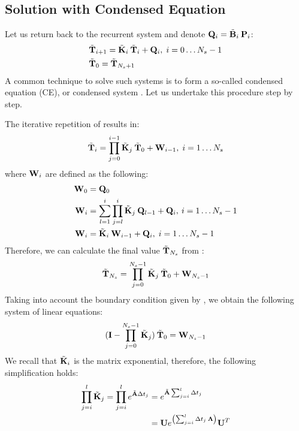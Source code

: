 \subsection{Solution with Condensed Equation}
Let us return back to the recurrent system and denote \mbox{$\mathbf{Q}_i = \tilde{\mathbf{B}}_i \: \mathbf{P}_i$}:
\begin{align}
  & \tilde{\mathbf{T}}_{i + 1} = \tilde{\mathbf{K}}_i \: \tilde{\mathbf{T}}_i + \mathbf{Q}_i, \; i = 0 \dots N_s - 1 \label{eq:ce-recurrent} \\
  & \tilde{\mathbf{T}}_0 = \tilde{\mathbf{T}}_{N_s + 1} \nonumber
\end{align}
A common technique to solve such systems is to form a so-called condensed equation (CE), or condensed system \cite{stoer2002}. Let us undertake this procedure step by step.

The iterative repetition of  results in:
\begin{equation} \label{eq:y-recurrent}
  \tilde{\mathbf{T}}_i = \prod_{j = 0}^{i - 1} \tilde{\mathbf{K}}_j \: \tilde{\mathbf{T}}_0 + \mathbf{W}_{i - 1}, \; i = 1 \dots N_s
\end{equation}
where $\mathbf{W}_i$ are defined as the following:
\begin{align}
  \mathbf{W}_0 & = \mathbf{Q}_0 \nonumber \\
  \mathbf{W}_i & = \sum_{l = 1}^i \prod_{j = l}^i \tilde{\mathbf{K}}_j \: \mathbf{Q}_{l - 1} + \mathbf{Q}_i, \: i = 1 \dots N_s - 1 \nonumber \\
  \mathbf{W}_i & = \tilde{\mathbf{K}}_i \: \mathbf{W}_{i - 1} + \mathbf{Q}_i, \; i = 1 \dots N_s - 1 \label{eq:p-recurrent}
\end{align}
Therefore, we can calculate the final value $\tilde{\mathbf{T}}_{N_s}$ from :
\[
  \tilde{\mathbf{T}}_{N_s} = \prod_{j = 0}^{N_s - 1} \tilde{\mathbf{K}}_j \: \tilde{\mathbf{T}}_0 + \mathbf{W}_{N_s - 1}
\]
Taking into account the boundary condition given by , we obtain the following system of linear equations:
\begin{equation} \label{eq:core-system}
  (\mathbf{I} - \prod_{j = 0}^{N_s - 1} \tilde{\mathbf{K}}_j) \: \tilde{\mathbf{T}}_0 = \mathbf{W}_{N_s - 1}
\end{equation}
We recall that $\tilde{\mathbf{K}}_i$ is the matrix exponential, therefore, the following simplification holds:
\begin{align*}
  \prod_{j = i}^l \tilde{\mathbf{K}}_j = \prod_{j = i}^l e^{\tilde{\mathbf{A}} \Delta t_j} & = e^{\tilde{\mathbf{A}} \sum_{j = i}^l \Delta t_j} \\
  & = \mathbf{U} e^{\left( \sum_{j = i}^l \Delta t_j \: \mathbf{\Lambda} \right)} \mathbf{U}^T
\end{align*}
